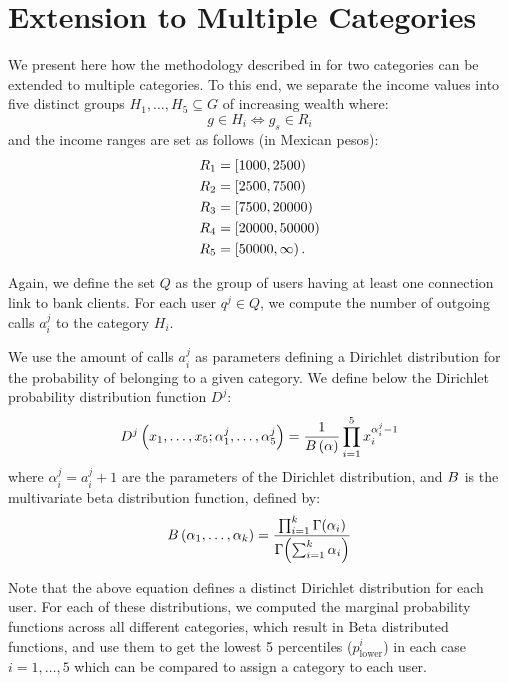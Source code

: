 \section{Extension to Multiple Categories}

We present here how the methodology described in  for
two categories can be extended to multiple categories.
To this end, we separate the income values into five distinct groups $ H_1, \ldots, H_5 \subseteq G$ of increasing wealth where:
\[
	g \in H_i \iff g_s \in R_i
\]
and the income ranges are set as follows (in Mexican pesos):
\begin{align*}
	R_1 &= \left[ 1000, 2500 \right) \\
	R_2 &= \left[ 2500, 7500 \right) \\
	R_3 &= \left[ 7500, 20000 \right) \\
	R_4 &= \left[ 20000, 50000 \right) \\
	R_5 &= \left[ 50000, \infty \right). \\
\end{align*}

Again, we define the set $Q$ as the group of users having at least one connection link to bank clients. For each user $q^j \in Q$, we compute the number of outgoing calls $a^j_i$ to the category $H_i$.

We use the amount of calls $a^j_i$  as parameters defining a Dirichlet distribution for the probability of belonging to a given category.
We define below the Dirichlet probability distribution function $D^j$:
\begin{equation}
D^j \left( x_1, \ldots, x_5; \alpha^j_1, \ldots, \alpha^j_5 \right) = \frac{1}{B \left( \alpha \right)} \prod^5_{i = 1} x_i^{\alpha^j_i - 1}
\label{Dirichlet}
\end{equation}
where $\alpha^j_i = a^j_i +1$ are the parameters of the Dirichlet distribution, and $B$ is the multivariate beta distribution function, defined by: %
\begin{equation}
B \left( \alpha_1, \ldots, \alpha_k \right) = \frac{\prod^k_{i = 1} \Gamma \! \left( \alpha_i \right)}{\Gamma \! \left( \sum^k_{i = 1} \alpha_i \right) }
\label{Beta}
\end{equation}

Note that the above equation defines a distinct Dirichlet distribution for each user. For each of these distributions, we computed the marginal probability functions across all different categories, which result in Beta distributed functions, and use them to get the lowest 5 percentiles (\(p^i_{\operatorname{lower}}\)) in each case ${i=1, \ldots, 5}$ which can be compared to assign a category to each user.

